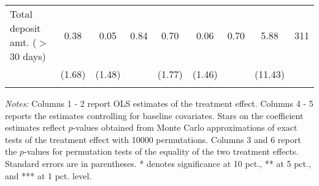 \begin{table}[h]
{\begin{threeparttable}
\begin{tabular}{l*{8}{c}}
Total deposit amt. ($>$ 30 days)&     0.38&     0.05&     0.84&     0.70&     0.06&     0.70&     5.88&      311\\
          &   (1.68)&   (1.48)&         &   (1.77)&   (1.46)&         &  (11.43)&         \\
          &         &         &         &         &         &         &         &         \\
\bottomrule \end{tabular} \begin{tablenotes}[flushleft] \footnotesize \item \emph{Notes:} Columns 1 - 2 report OLS estimates of the treatment effect. Columns 4 - 5 reports the estimates controlling for baseline covariates. Stars on the coefficient estimates reflect \(p\)-values obtained from Monte Carlo approximations of exact tests of the treatment effect with 10000 permutations. Columns 3 and 6 report the \(p\)-values for permutation tests of the equality of the two treatment effects. Standard errors are in parentheses. * denotes significance at 10 pct., ** at 5 pct., and *** at 1 pct. level. \end{tablenotes} \end{threeparttable} } \end{table}

